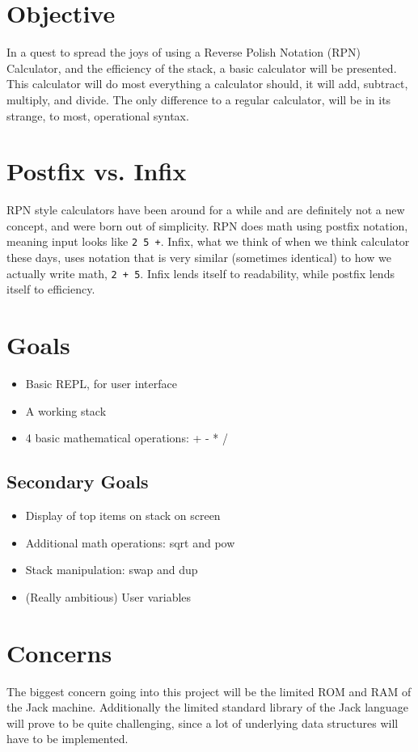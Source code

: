 \section{Objective}
    In a quest to spread the joys of using a Reverse Polish Notation (RPN)
    Calculator, and the efficiency of the stack, a basic calculator will be
    presented. This calculator will do most everything a calculator should, it
    will add, subtract, multiply, and divide. The only difference to a regular
    calculator, will be in its strange, to most, operational syntax.

\section{Postfix vs. Infix}
    RPN style calculators have been around for a while and are definitely not a
    new concept, and were born out of simplicity. RPN does math using postfix
    notation, meaning input looks like \texttt{2 5 +}. Infix, what we think of
    when we think calculator these days, uses notation that is very similar
    (sometimes identical) to how we actually write math, \texttt{2 + 5}. Infix
    lends itself to readability, while postfix lends itself to efficiency.

\section{Goals}
    \begin{itemize}
        \item Basic REPL, for user interface
        \item A working stack
        \item 4 basic mathematical operations: + - * /
    \end{itemize}
    \subsection{Secondary Goals}
        \begin{itemize}
            \item Display of top items on stack on screen
            \item Additional math operations: sqrt and pow
            \item Stack manipulation: swap and dup
            \item (Really ambitious) User variables
        \end{itemize}

\section{Concerns}
    The biggest concern going into this project will be the limited ROM and RAM of
    the Jack machine. Additionally the limited standard library of the Jack
    language will prove to be quite challenging, since a lot of underlying data
    structures will have to be implemented.

